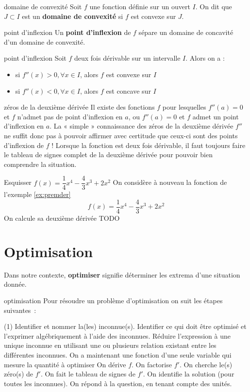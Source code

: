 \documentclass[a4paper,12pt]{article}
\begin{document}
\begin{definition}
	domaine de convexité
	\tcblower
	Soit $f$ une fonction définie sur un ouvert $I$. On dit que $J\subset I$ est un {\bfseries domaine de convexité} si $f$ est convexe sur $J$. 
\end{definition}

\begin{definition}
	point d'inflexion
	\tcblower
Un \textbf{point d'inflexion} de $f$ sépare un domaine de concavité d'un domaine de convexité.
\end{definition}
\begin{thm}
point d'inflexion
\tcblower
Soit $f$ deux fois dérivable sur un intervalle $I$. Alors on a :
\begin{itemize}
	\item si $f''(x) > 0, \forall x \in I$, alors $f$ est convexe sur $I$
	\item si $f''(x) < 0, \forall x \in I$, alors $f$ est concave sur $I$
\end{itemize}
\end{thm}
\begin{remarque}
	zéros de la deuxième dérivée
	\tcblower
Il existe des fonctions $f$ pour lesquelles $f''(a) = 0$ et $f$ n'admet pas de point d'inflexion en $a$, ou $f''(a) = 0$ et $f$ admet un point d'inflexion en $a$. La « simple » connaissance des zéros de la deuxième dérivée $f''$ ne suffit donc pas à pouvoir affirmer avec certitude que ceux-ci sont des points d'inflexion de $f$ ! Lorsque la fonction est deux fois dérivable, il faut toujours faire le tableau de signes complet de la deuxième dérivée pour pouvoir bien comprendre la situation.
\end{remarque}
\begin{exemple}
	Esquisser $f(x)=\dfrac{1}{4}x^4-\dfrac{4}{3}x^3+2x^2$  
	\tcblower
On considère à nouveau la fonction de l'exemple \ref{ex:premder} 
\[f(x)=\dfrac{1}{4}x^4-\dfrac{4}{3}x^3+2x^2\] 
On calcule sa deuxième dérivée 
TODO
\end{exemple}
\section{Optimisation}
\label{sec:opti}
Dans notre contexte, \textbf{optimiser} signifie déterminer les extrema d'une situation donnée.

\begin{methode}
optimisation
\tcblower
Pour résoudre un problème d'optimisation on suit les étapes suivantes~:
\begin{tasks}(1)
\task Identifier et nommer la(les) inconnue(s).
\task Identifier ce qui doit être optimisé et l'exprimer algébriquement à l'aide des inconnues.
\task Réduire l'expression à une unique inconnue en utilisant une ou plusieurs relation existant entre les différentes inconnues.
\task On a maintenant une fonction d'une seule variable qui mesure la quantité à optimiser
\task On dérive $f$.
\task On factorise $f'$.
\task On cherche le(s) zéro(s) de $f'$.
\task On fait le tableau de signes de $f'$.
\task On identifie la solution (pour toutes les inconnues).
\task On répond à la question, en tenant compte des unités.
\end{tasks}
\end{methode}
\end{document}
